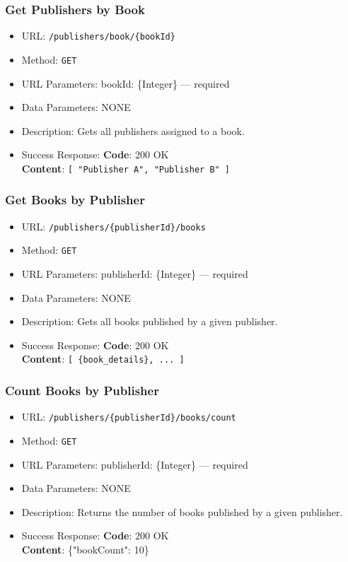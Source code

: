 \subsubsection*{Get Publishers by Book}

\begin{itemize}
    \item URL: \texttt{/publishers/book/\{bookId\}}
    \item Method: \texttt{GET}
    \item URL Parameters: bookId: \{Integer\} — required
    \item Data Parameters: NONE
    \item Description: Gets all publishers assigned to a book.

    \item Success Response: \newline
    \textbf{Code}: 200 OK \\
    \textbf{Content}: \texttt{[ "Publisher A", "Publisher B" ]}
\end{itemize}

\subsubsection*{Get Books by Publisher}

\begin{itemize}
    \item URL: \texttt{/publishers/\{publisherId\}/books}
    \item Method: \texttt{GET}
    \item URL Parameters: publisherId: \{Integer\} — required
    \item Data Parameters: NONE
    \item Description: Gets all books published by a given publisher.

    \item Success Response: \newline
    \textbf{Code}: 200 OK \\
    \textbf{Content}: \texttt{[ \{book\_details\}, ... ]}
\end{itemize}

\subsubsection*{Count Books by Publisher}

\begin{itemize}
    \item URL: \texttt{/publishers/\{publisherId\}/books/count}
    \item Method: \texttt{GET}
    \item URL Parameters: publisherId: \{Integer\} — required
    \item Data Parameters: NONE
    \item Description: Returns the number of books published by a given publisher.

    \item Success Response: \newline
    \textbf{Code}: 200 OK \\
    \textbf{Content}: \{"bookCount": 10\}
\end{itemize}

